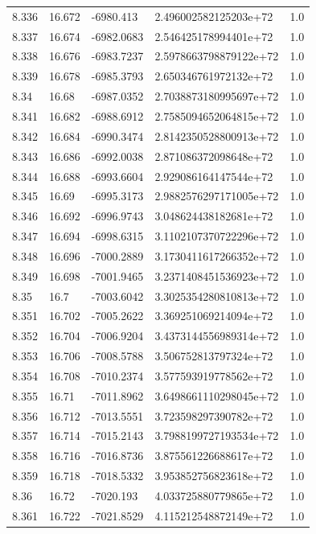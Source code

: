 \begin{tabular}{lllll}
8.336 & 16.672 & -6980.413 & 2.496002582125203e+72 & 1.0 \\
8.337 & 16.674 & -6982.0683 & 2.546425178994401e+72 & 1.0 \\
8.338 & 16.676 & -6983.7237 & 2.5978663798879122e+72 & 1.0 \\
8.339 & 16.678 & -6985.3793 & 2.650346761972132e+72 & 1.0 \\
8.34 & 16.68 & -6987.0352 & 2.7038873180995697e+72 & 1.0 \\
8.341 & 16.682 & -6988.6912 & 2.7585094652064815e+72 & 1.0 \\
8.342 & 16.684 & -6990.3474 & 2.8142350528800913e+72 & 1.0 \\
8.343 & 16.686 & -6992.0038 & 2.871086372098648e+72 & 1.0 \\
8.344 & 16.688 & -6993.6604 & 2.929086164147544e+72 & 1.0 \\
8.345 & 16.69 & -6995.3173 & 2.9882576297171005e+72 & 1.0 \\
8.346 & 16.692 & -6996.9743 & 3.048624438182681e+72 & 1.0 \\
8.347 & 16.694 & -6998.6315 & 3.1102107370722296e+72 & 1.0 \\
8.348 & 16.696 & -7000.2889 & 3.1730411617266352e+72 & 1.0 \\
8.349 & 16.698 & -7001.9465 & 3.2371408451536923e+72 & 1.0 \\
8.35 & 16.7 & -7003.6042 & 3.3025354280810813e+72 & 1.0 \\
8.351 & 16.702 & -7005.2622 & 3.369251069214094e+72 & 1.0 \\
8.352 & 16.704 & -7006.9204 & 3.4373144556989314e+72 & 1.0 \\
8.353 & 16.706 & -7008.5788 & 3.506752813797324e+72 & 1.0 \\
8.354 & 16.708 & -7010.2374 & 3.577593919778562e+72 & 1.0 \\
8.355 & 16.71 & -7011.8962 & 3.6498661110298045e+72 & 1.0 \\
8.356 & 16.712 & -7013.5551 & 3.723598297390782e+72 & 1.0 \\
8.357 & 16.714 & -7015.2143 & 3.7988199727193534e+72 & 1.0 \\
8.358 & 16.716 & -7016.8736 & 3.875561226688617e+72 & 1.0 \\
8.359 & 16.718 & -7018.5332 & 3.953852756823618e+72 & 1.0 \\
8.36 & 16.72 & -7020.193 & 4.033725880779865e+72 & 1.0 \\
8.361 & 16.722 & -7021.8529 & 4.115212548872149e+72 & 1.0 \\

\end{tabular}
